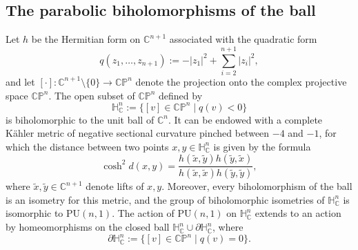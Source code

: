 \documentclass[JEP,XML,SOM,Unicode,NoEqCountersInSection,published]{cedram}
\theoremstyle{definition}
\newcommand{\C}{\mathbb{C}}
\newcommand{\HNC}{\mathbb{H}^{n}_{\C}}
\newcommand{\PHNC}{\partial\mathbb{H}^{n}_{\C}}
\newcommand{\PU}{\mathrm{PU}}
\newcommand{\PNC}{\C \mathbb{P}^{n}}
\def\C{\mathbb{C}}
\newcommand{\HNC}{\mathbb{H}^{n}_{\C}}
\newcommand{\PU}{\mathrm{PU}}
\begin{document}
\subsection{The parabolic biholomorphisms of the ball}\label{ss-section-preli-parab}

Let $h$ be the Hermitian form on $\C^{n+1}$ associated with the quadratic form
\begin{equation*}
q(z_1,\dots,z_{n+1}):=-\lvert z_1\rvert^{2} + \sum_{i=2}^{n+1}\lvert z_i\rvert^{2},
\end{equation*}
and let $[\cdot]:\C^{n+1}\setminus\{0\} \to \PNC$ denote the projection onto the complex projective space $\PNC$. The open subset of $\PNC$ defined by
\begin{equation*}
\HNC:= \{[v]\in \PNC \mid q(v)<0\}
\end{equation*}
is biholomorphic to the unit ball of $\C^{n}$. It can be endowed with a complete Kähler metric of negative sectional curvature pinched between $-4$ and $-1$, for which the distance between two points $x,y\in \HNC$ is given by the formula
\begin{equation*}
\cosh^{2}d(x,y) = \frac{h(\widetilde{x},\widetilde{y}) h(\widetilde{y},\widetilde{x})}{ h(\widetilde{x},\widetilde{x}) h(\widetilde{y},\widetilde{y})},
\end{equation*}
where $\widetilde{x},\widetilde{y}\in \C^{n+1}$ denote lifts of $x,y$. Moreover, every biholomorphism of the ball is an isometry for this metric, and the group of biholomorphic isometries of $\HNC$ is isomorphic to $\PU(n,1)$. The action of $\PU(n,1)$ on $\HNC$ extends to an action by homeomorphisms on the closed ball $\HNC\cup \PHNC$, where
\begin{equation*}
\PHNC:= \{[v]\in \PNC \mid q(v)=0\}.
\end{equation*}
\end{document}
